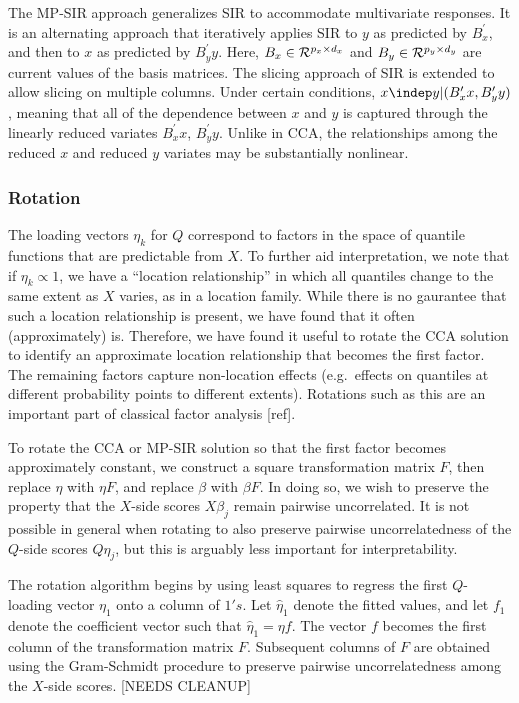 The MP-SIR approach generalizes SIR to accommodate multivariate responses.
It is an alternating approach that iteratively applies SIR to $y$ as
predicted by $B_x^\prime$, and then to $x$ as predicted by $B_y^\prime y$.
Here, $B_x \in {\cal R}^{p_x\times d_x}$ and $B_y \in {\cal R}^{p_y\times
d_y}$ are current values of the basis matrices.  The slicing approach
of SIR is extended to allow slicing on multiple columns.  Under certain
conditions, $x \indep y | (B_x^\prime x, B_y^\prime y)$, meaning that all
of the dependence between $x$ and $y$ is captured through the linearly
reduced variates $B_x^\prime x$, $B_y^\prime y$.  Unlike in CCA, the
relationships among the reduced $x$ and reduced $y$ variates may be
substantially nonlinear.

\subsubsection{Rotation}

The loading vectors $\eta_k$ for $Q$ correspond to factors in the space
of quantile functions that are predictable from $X$.  To further aid
interpretation, we note that if $\eta_k \propto 1$, we have a ``location
relationship'' in which all quantiles change to the same extent as $X$
varies, as in a location family.  While there is no gaurantee that
such a location relationship is present, we have found that it often
(approximately) is.  Therefore, we have found it useful to rotate the
CCA solution to identify an approximate location relationship that
becomes the first factor.  The remaining factors capture non-location
effects (e.g.\ effects on quantiles at different probability points to
different extents).  Rotations such as this are an important part of
classical factor analysis [ref].

To rotate the CCA or MP-SIR solution so that the first factor becomes
approximately constant, we construct a square transformation matrix $F$,
then replace $\eta$ with $\eta F$, and replace $\beta$ with $\beta F$.
In doing so, we wish to preserve the property that the $X$-side
scores $X\beta_j$ remain pairwise uncorrelated.  It is not possible
in general when rotating to also preserve pairwise uncorrelatedness of
the $Q$-side scores $Q\eta_j$, but this is arguably less important for
interpretability.

The rotation algorithm begins by using least squares to regress the first
$Q$-loading vector $\eta_1$ onto a column of $1's$.  Let $\hat{\eta}_1$
denote the fitted values, and let $f_1$ denote the coefficient vector
such that $\hat{\eta}_1 = \eta f$. The vector $f$ becomes the first
column of the transformation matrix $F$.  Subsequent columns of $F$
are obtained using the Gram-Schmidt procedure to preserve pairwise
uncorrelatedness among the $X$-side scores. [NEEDS CLEANUP]

